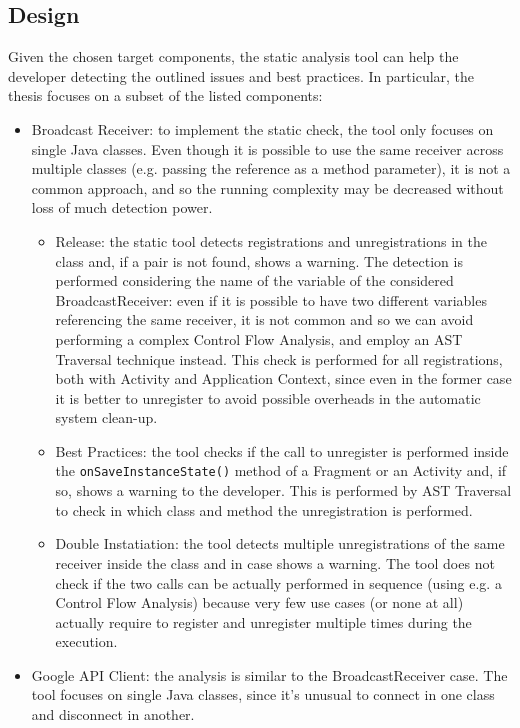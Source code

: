 \documentclass[11pt,a4paper,notitlepage]{article}
\begin{document}
\subsection{Design}
Given the chosen target components, the static analysis tool can help the developer detecting the outlined issues and best practices. In particular, the thesis focuses on a subset of the listed components:
\begin{itemize}
	\item Broadcast Receiver: to implement the static check, the tool only focuses on single Java classes. Even though it is possible to use the same receiver across multiple classes (e.g. passing the reference as a method parameter), it is not a common approach, and so the running complexity may be decreased without loss of much detection power.
	\begin{itemize}
		\item Release: the static tool detects registrations and unregistrations in the class and, if a pair is not found, shows a warning. The detection is performed considering the name of the variable of the considered BroadcastReceiver: even if it is possible to have two different variables referencing the same receiver, it is not common and so we can avoid performing a complex Control Flow Analysis, and employ an AST Traversal technique instead. This check is performed for all registrations, both with Activity and Application Context, since even in the former case it is better to unregister to avoid possible overheads in the automatic system clean-up.
		\item Best Practices: the tool checks if the call to unregister is performed inside the \texttt{onSaveInstanceState()} method of a Fragment or an Activity and, if so, shows a warning to the developer. This is performed by AST Traversal to check in which class and method the unregistration is performed.
		\item Double Instatiation: the tool detects multiple unregistrations of the same receiver inside the class and in case shows a warning. The tool does not check if the two calls can be actually performed in sequence (using e.g. a Control Flow Analysis) because very few use cases (or none at all) actually require to register and unregister multiple times during the execution.
	\end{itemize}
	\item Google API Client: the analysis is similar to the BroadcastReceiver case. The tool focuses on single Java classes, since it's unusual to connect in one class and disconnect in another.

\end{itemize}
\end{document}
